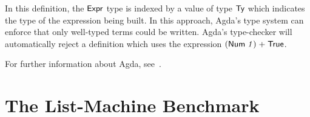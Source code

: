 \documentclass[sigconf]{acmart}
\theoremstyle{definition}
\newcommand{\D}[1]{\blue{\mathsf{#1}}}
\newcommand{\Con}[1]{\red{\mathsf{#1}}}
\newcommand{\V}[1]{\purple{\mathit{#1}}}
\begin{document}
In this definition, the \ensuremath{\D{Expr}} type is indexed by a value of type \ensuremath{\D{Ty}} which
indicates the type of the expression being built. In this approach, Agda's
type system can enforce that only well-typed terms could be written.
Agda's type-checker will automatically reject a definition which uses the expression \ensuremath{(\Con{Num}\;\V{1})\;\V{+}\;\Con{True}}.

For further information about Agda, see~\cite{Norell2009,Stump16}.

%





\section{The List-Machine Benchmark}\label{sec:list}
\end{document}
